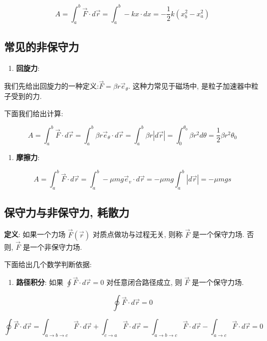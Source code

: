 \documentclass[
  a4paper,
]{ctexrep}
\providecommand{\tightlist}{%
  \setlength{\itemsep}{0pt}\setlength{\parskip}{0pt}}
\begin{document}
\[A = \int_a^b \vec{F} \cdot d\vec{r} = \int_a^b -k x \cdot dx = -\frac{1}{2} k (x_b^2 - x_a^2)\]

\subsection{常见的非保守力}\label{ux5e38ux89c1ux7684ux975eux4fddux5b88ux529b}

\begin{enumerate}
\def\labelenumi{\arabic{enumi}.}
\tightlist
\item
  \textbf{回旋力}:
\end{enumerate}

我们先给出回旋力的一种定义:\(\vec{F} = \beta r \vec{e}_\theta\).
这种力常见于磁场中, 是粒子加速器中粒子受到的力.

下面我们给出计算:

\[
A = \int_a^b \vec{F} \cdot d\vec{r} = \int_a^b \beta r \vec{e}_\theta \cdot d\vec{r} = \int_a^b \beta r |d\vec{r}| = \int_0^{\theta_0} \beta r^2 d\theta = \frac{1}{2} \beta r^2 \theta_0
\]

\begin{enumerate}
\def\labelenumi{\arabic{enumi}.}
\setcounter{enumi}{1}
\tightlist
\item
  \textbf{摩擦力}:
\end{enumerate}

\[A = \int_a^b \vec{F} \cdot d\vec{r} = \int_a^b -\mu m g \vec{e}_v \cdot d\vec{r} = -\mu m g \int_a^b |d\vec{r}| = -\mu m g s\]

\subsection{保守力与非保守力,
耗散力}\label{ux4fddux5b88ux529bux4e0eux975eux4fddux5b88ux529b-ux8017ux6563ux529b}

\textbf{定义}: 如果一个力场 \(\vec{F}(\vec{r})\) 对质点做功与过程无关,
则称 \(\vec{F}\) 是一个保守力场. 否则, \(\vec{F}\) 是一个非保守力场.

下面给出几个数学判断依据:

\begin{enumerate}
\def\labelenumi{\arabic{enumi}.}
\tightlist
\item
  \textbf{路径积分}: 如果 \(\oint \vec{F} \cdot d\vec{r} = 0\)
  对任意闭合路径成立, 则 \(\vec{F}\) 是一个保守力场.
\end{enumerate}

\[
\oint \vec{F} \cdot d\vec{r} = 0
\]

\[
\oint \vec{F} \cdot d\vec{r} = \int_{a \to b \to c} \vec{F} \cdot d\vec{r} + \int_{c \to a} \vec{F} \cdot d\vec{r} = \int_{a \to b \to c} \vec{F} \cdot d\vec{r} - \int_{a \to c} \vec{F} \cdot d\vec{r} = 0
\]
\end{document}
